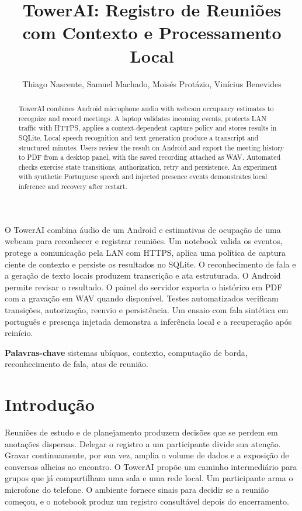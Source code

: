 \documentclass[12pt]{article}
\title{TowerAI: Registro de Reuniões com Contexto e Processamento Local}
\author{Thiago Nascente\inst{1}, Samuel Machado\inst{1}, Moisés Protázio\inst{1}, Vinícius Benevides\inst{1}}
\begin{document}
\maketitle

\begin{abstract}
TowerAI combines Android microphone audio with webcam occupancy estimates to recognize and record meetings. A laptop validates incoming events, protects LAN traffic with HTTPS, applies a context-dependent capture policy and stores results in SQLite. Local speech recognition and text generation produce a transcript and structured minutes. Users review the result on Android and export the meeting history to PDF from a desktop panel, with the saved recording attached as WAV. Automated checks exercise state transitions, authorization, retry and persistence. An experiment with synthetic Portuguese speech and injected presence events demonstrates local inference and recovery after restart.
\end{abstract}

\begin{resumo}
O TowerAI combina áudio de um Android e estimativas de ocupação de uma webcam para reconhecer e registrar reuniões. Um notebook valida os eventos, protege a comunicação pela LAN com HTTPS, aplica uma política de captura ciente de contexto e persiste os resultados no SQLite. O reconhecimento de fala e a geração de texto locais produzem transcrição e ata estruturada. O Android permite revisar o resultado. O painel do servidor exporta o histórico em PDF com a gravação em WAV quando disponível. Testes automatizados verificam transições, autorização, reenvio e persistência. Um ensaio com fala sintética em português e presença injetada demonstra a inferência local e a recuperação após reinício.
\end{resumo}

\noindent\textbf{Palavras-chave} \enspace sistemas ubíquos, contexto, computação de borda, reconhecimento de fala, atas de reunião.

\section{Introdução}

Reuniões de estudo e de planejamento produzem decisões que se perdem em anotações dispersas. Delegar o registro a um participante divide sua atenção. Gravar continuamente, por sua vez, amplia o volume de dados e a exposição de conversas alheias ao encontro. O TowerAI propõe um caminho intermediário para grupos que já compartilham uma sala e uma rede local. Um participante arma o microfone do telefone. O ambiente fornece sinais para decidir se a reunião começou, e o notebook produz um registro consultável depois do encerramento.
\end{document}
